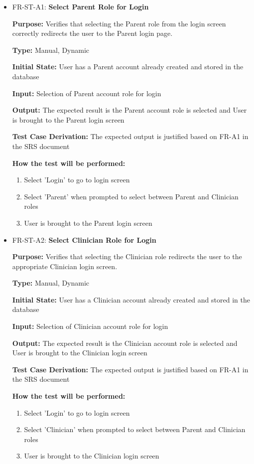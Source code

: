 \documentclass[12pt, titlepage]{article}
\begin{document}
\begin{itemize}
  \item FR-ST-A1: \textbf{Select Parent Role for Login}
  \begin{mdframed}[linewidth=0.5mm]
      \textbf{Purpose:} Verifies that selecting the Parent role from the login screen correctly redirects the user to the Parent login page. \par
      \textbf{Type:} Manual, Dynamic \par
      \textbf{Initial State:} User has a Parent account already created and stored in the database \par
      \textbf{Input:} Selection of Parent account role for login \par
      \textbf{Output:} The expected result is the Parent account role is selected and User is brought to the Parent login screen \par
      \textbf{Test Case Derivation:} The expected output is justified based on FR-A1 in the SRS document \par
      \textbf{How the test will be performed:}
      \begin{enumerate}[noitemsep]
        \item Select 'Login' to go to login screen
        \item Select 'Parent' when prompted to select between Parent and Clinician roles
        \item User is brought to the Parent login screen
      \end{enumerate}
  \end{mdframed}

  \item FR-ST-A2: \textbf{Select Clinician Role for Login}
  \begin{mdframed}[linewidth=0.5mm]
      \textbf{Purpose:} Verifies that selecting the Clinician role redirects the user to the appropriate Clinician login screen. \par
      \textbf{Type:} Manual, Dynamic \par
      \textbf{Initial State:} User has a Clinician account already created and stored in the database \par
      \textbf{Input:} Selection of Clinician account role for login \par
      \textbf{Output:} The expected result is the Clinician account role is selected and User is brought to the Clinician login screen \par
      \textbf{Test Case Derivation:} The expected output is justified based on FR-A1 in the SRS document \par
      \textbf{How the test will be performed:}
      \begin{enumerate}[noitemsep]
        \item Select 'Login' to go to login screen
        \item Select 'Clinician' when prompted to select between Parent and Clinician roles
        \item User is brought to the Clinician login screen
      \end{enumerate}
  \end{mdframed}


\end{itemize}
\end{document}
